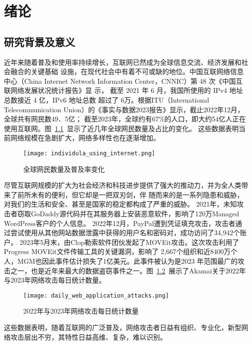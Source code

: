 \chapter{绪论}
\label{cha:overview}

\section{研究背景及意义}

近年来随着普及和使用率持续增长，互联网已然成为全球信息交流、经济发展和社会融合的关键基础
设施，在现代社会中有着不可或缺的地位。中国互联网络信息中心（China Internet 
Network Information Center，CNNIC）第 48 次《中国互联网络发展状况统计报告》显
示\cite{cnnic2021}， 截至 2021 年 6 月，我国所使用的 IPv4 地址总数接近 4 亿，IPv6 地址总数
超过了 6万。根据ITU（International Telecommunication Union）的《事实与数据2023报告》显示\cite{itu2023}，截止2022年12月，全球共有网民数49．5亿；
截至2023年，全球约有67\%的人口，即大约54亿人正在使用互联网。图~\ref{fig:individula_using_internet}~显示了近几年全球网民数量及占比的变化。
这些数据表明当前网络规模在急剧扩大，网络多样性也在逐渐增加。
\begin{figure}[htbp]
    \centering
    \texttt{[image: individula\_using\_internet.png]}
    \caption{全球网民数量及普及率变化\cite{fig-itu2023}}
    \label{fig:individula_using_internet}
\end{figure} 


尽管互联网规模的扩大为社会经济和科技进步提供了强大的推动力，并为全人类带来了前所未有的便利，但它却是一把双刃剑，伴
随而来的是一系列隐患和威胁，对我们的生活和安全、甚至是国家的稳定都构成了严重的威胁。
2021年，未知攻击者窃取GoDaddy源代码并在其服务器上安装恶意软件，影响了120万Managed WordPress客户的个人信息。
2022年12月，PayPal遭到凭证填充攻击，攻击者通过尝试使用从其他网站数据泄露中获得的用户名和密码对，成功访问了34,942个账户。
2023年5月末，由Clop勒索软件团伙发起了MOVEit攻击。这次攻击利用了Progress MOVEit文件传输工具的关键漏洞，影响了
2,667个组织和近8400万个人，MGM也因此事件估计损失了1亿美元​。此事件被认为是2023
年范围最广的攻击之一，也是近年来最大的数据盗窃事件之一。图~\ref{fig:daily_web_application_attacks}~展示了Akamai关于2022年
与2023年网络攻击每日统计数量。
\begin{figure}[htbp]
  \centering
  \texttt{[image: daily\_web\_application\_attacks.png]}
  \caption{2022年与2023年网络攻击每日统计数量\cite{akamai}}
  \label{fig:daily_web_application_attacks}
\end{figure}
这些数据表明，随着互联网的广泛普及，网络攻击者日益有组织、专业化，新型网络攻击层出不穷，其特性日益高维、复杂，难以识别。\par

